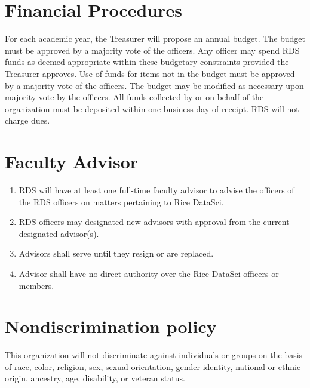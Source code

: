 \documentclass[12pt]{article}
\begin{document}


\section{Financial Procedures}

For each academic year, the Treasurer will propose an annual budget. The budget
must be approved by a  majority vote of the officers. Any officer
may spend RDS funds as deemed appropriate within these budgetary constraints
provided the Treasurer approves. Use of funds for items not in the budget must
be approved by a  majority vote of the officers. The budget may be
modified as necessary upon  majority vote by the officers. All
funds collected by or on behalf of the organization must be deposited within
one business day of receipt. RDS will not charge dues.




\section{Faculty Advisor}

\begin{enumerate}
  \item RDS will have at least one full-time faculty advisor to advise the
    officers of the RDS officers on matters pertaining to Rice DataSci. 

  \item RDS officers may designated new advisors with approval from the current
    designated advisor(s). 

  \item Advisors shall serve until they resign or are replaced. 

  \item Advisor shall have no direct authority over the Rice DataSci officers or
    members.  
\end{enumerate}



\section{Nondiscrimination policy}

This organization will not discriminate against individuals or groups on the
basis of race, color, religion, sex, sexual orientation, gender identity,
national or ethnic origin, ancestry, age, disability, or veteran status.
\end{document}
